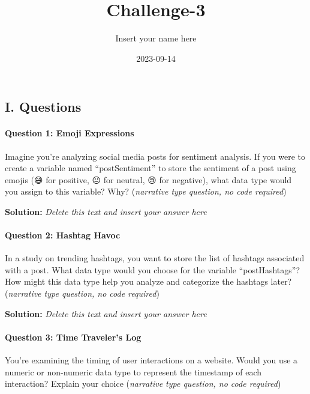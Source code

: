 \documentclass[
]{article}
\title{Challenge-3}
\author{Insert your name here}
\date{2023-09-14}
\begin{document}
\maketitle

\hypertarget{i.-questions}{%
\subsection{I. Questions}\label{i.-questions}}

\hypertarget{question-1-emoji-expressions}{%
\paragraph{Question 1: Emoji
Expressions}\label{question-1-emoji-expressions}}

Imagine you're analyzing social media posts for sentiment analysis. If
you were to create a variable named ``postSentiment'' to store the
sentiment of a post using emojis (😄 for positive, 😐 for neutral, 😢
for negative), what data type would you assign to this variable? Why?
(\emph{narrative type question, no code required})

\textbf{Solution:} \emph{Delete this text and insert your answer here}

\hypertarget{question-2-hashtag-havoc}{%
\paragraph{Question 2: Hashtag Havoc}\label{question-2-hashtag-havoc}}

In a study on trending hashtags, you want to store the list of hashtags
associated with a post. What data type would you choose for the variable
``postHashtags''? How might this data type help you analyze and
categorize the hashtags later? (\emph{narrative type question, no code
required})

\textbf{Solution:} \emph{Delete this text and insert your answer here}

\hypertarget{question-3-time-travelers-log}{%
\paragraph{Question 3: Time Traveler's
Log}\label{question-3-time-travelers-log}}

You're examining the timing of user interactions on a website. Would you
use a numeric or non-numeric data type to represent the timestamp of
each interaction? Explain your choice (\emph{narrative type question, no
code required})
\end{document}
